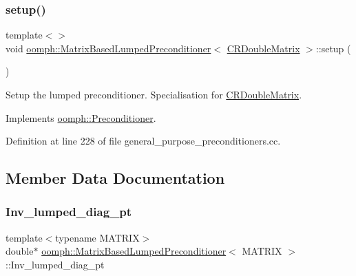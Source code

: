 \subsubsection{\texorpdfstring{setup()}{setup()}\hspace{0.1cm}{\footnotesize\ttfamily [3/3]}}
{\footnotesize\ttfamily template$<$$>$ \\
void \hyperlink{classoomph_1_1MatrixBasedLumpedPreconditioner}{oomph\+::\+Matrix\+Based\+Lumped\+Preconditioner}$<$ \hyperlink{classoomph_1_1CRDoubleMatrix}{C\+R\+Double\+Matrix} $>$\+::setup (\begin{DoxyParamCaption}{ }\end{DoxyParamCaption})\hspace{0.3cm}{\ttfamily [virtual]}}



Setup the lumped preconditioner. Specialisation for \hyperlink{classoomph_1_1CRDoubleMatrix}{C\+R\+Double\+Matrix}. 



Implements \hyperlink{classoomph_1_1Preconditioner_af4886f4efe510e5c9b0eb19422943588}{oomph\+::\+Preconditioner}.



Definition at line 228 of file general\+\_\+purpose\+\_\+preconditioners.\+cc.



\subsection{Member Data Documentation}
\mbox{\label{classoomph_1_1MatrixBasedLumpedPreconditioner_a67bbdb462159d3198d96e7beaa37e36f}} 
\subsubsection{\texorpdfstring{Inv\+\_\+lumped\+\_\+diag\+\_\+pt}{Inv\_lumped\_diag\_pt}}
{\footnotesize\ttfamily template$<$typename M\+A\+T\+R\+IX$>$ \\
double$\ast$ \hyperlink{classoomph_1_1MatrixBasedLumpedPreconditioner}{oomph\+::\+Matrix\+Based\+Lumped\+Preconditioner}$<$ M\+A\+T\+R\+IX $>$\+::Inv\+\_\+lumped\+\_\+diag\+\_\+pt\hspace{0.3cm}{\ttfamily [private]}}



